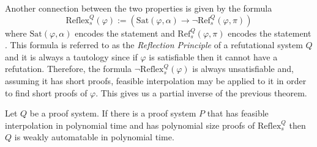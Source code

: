 Another connection between the two properties is given by the formula
\begin{equation}
    \mathrm{Reflex}_s^Q(\varphi) := (\mathrm{Sat}(\varphi, \alpha) \to \lnot \mathrm{Ref}_s^Q(\varphi, \pi))
\end{equation}
where $\mathrm{Sat}(\varphi, \alpha)$ encodes the statement  and $\mathrm{Ref}^Q_s(\varphi,\pi)$ encodes the statement . This formula is referred to as the \textit{Reflection Principle} \cite{pudlak_upper,resk_weakauto} of a refutational system $Q$ and it is always a tautology since if $\varphi$ is satisfiable then it cannot have a refutation. Therefore, the formula $\lnot \mathrm{Reflex}_s^Q(\varphi)$ is always unsatisfiable and, assuming it has short proofs, feasible interpolation may be applied to it in order to find short proofs of $\varphi$. This gives us a partial inverse of the previous theorem.

\begin{theorem}
    \label{thm:fi_waut}
    Let $Q$ be a proof system. If there is a proof system $P$ that has feasible interpolation in polynomial time and has polynomial size proofs of $\mathrm{Reflex}_s^Q$ then $Q$ is weakly automatable in polynomial time.
\end{theorem}

